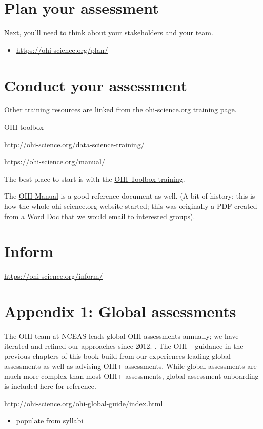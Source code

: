 \documentclass[
]{book}
\providecommand{\tightlist}{%
  \setlength{\itemsep}{0pt}\setlength{\parskip}{0pt}}
\begin{document}
\hypertarget{plan}{%
\chapter{Plan your assessment}\label{plan}}

Next, you'll need to think about your stakeholders and your team.

\begin{itemize}
\tightlist
\item
  \url{https://ohi-science.org/plan/}
\end{itemize}

\hypertarget{conduct}{%
\chapter{Conduct your assessment}\label{conduct}}

Other training resources are linked from the \href{https://ohi-science.org/training/}{ohi-science.org training page}.

OHI toolbox

\url{http://ohi-science.org/data-science-training/}

\url{https://ohi-science.org/manual/}

The best place to start is with the \href{http://ohi-science.org/toolbox-training/}{OHI Toolbox-training}.

The \href{https://ohi-science.org/manual/}{OHI Manual} is a good reference document as well. (A bit of history: this is how the whole ohi-science.org website started; this was originally a PDF created from a Word Doc that we would email to interested groups).

\hypertarget{inform}{%
\chapter{Inform}\label{inform}}

\url{https://ohi-science.org/inform/}

\hypertarget{global}{%
\chapter{Appendix 1: Global assessments}\label{global}}

The OHI team at NCEAS leads global OHI assessments annually; we have iterated and refined our approaches since 2012. . The OHI+ guidance in the previous chapters of this book build from our experiences leading global assessments as well as advising OHI+ assessments. While global assessments are much more complex than most OHI+ assessments, global assessment onboarding is included here for reference.

\url{http://ohi-science.org/ohi-global-guide/index.html}

\begin{itemize}
\tightlist
\item
  populate from syllabi
\end{itemize}

  
\end{document}
